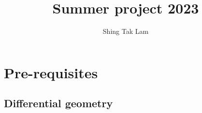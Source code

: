 \documentclass{report}
\title{Summer project 2023}
\author{Shing Tak Lam}
\begin{document}
\maketitle

\tableofcontents

\part{Pre-requisites}

\chapter{Differential geometry}









\end{document}
